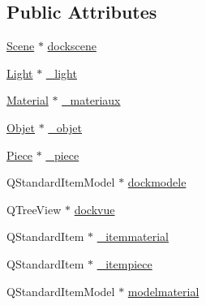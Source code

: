 \subsection*{Public Attributes}
\begin{DoxyCompactItemize}
\item 
\hyperlink{class_scene}{Scene} $\ast$ \hyperlink{class_mondock_ac6fd15f2143e05b554f3f936e6f1588f}{dockscene}
\item 
\hyperlink{class_light}{Light} $\ast$ \hyperlink{class_mondock_a541a241aadaf9820926b427f2d504573}{\+\_\+light}
\item 
\hyperlink{class_material}{Material} $\ast$ \hyperlink{class_mondock_ada15f5ec6dabb8728651472f5cc867a8}{\+\_\+materiaux}
\item 
\hyperlink{class_objet}{Objet} $\ast$ \hyperlink{class_mondock_a6325a3fb92643c99815b1a8025f7d401}{\+\_\+objet}
\item 
\hyperlink{class_piece}{Piece} $\ast$ \hyperlink{class_mondock_a8a9c524e7a781e45219699b15b20596f}{\+\_\+piece}
\item 
Q\+Standard\+Item\+Model $\ast$ \hyperlink{class_mondock_a3f46e1710907a9aedf250fce4ba93076}{dockmodele}
\item 
Q\+Tree\+View $\ast$ \hyperlink{class_mondock_a32e24e3ef7312fbd292740e19c3d3dcd}{dockvue}
\item 
Q\+Standard\+Item $\ast$ \hyperlink{class_mondock_ab873f19cf3a771dcb0f32480e3ea2c69}{\+\_\+itemmaterial}
\item 
Q\+Standard\+Item $\ast$ \hyperlink{class_mondock_a3de76b6bfaee199ee945f04c3c2f4c02}{\+\_\+itempiece}
\item 
Q\+Standard\+Item\+Model $\ast$ \hyperlink{class_mondock_aceda9fef8d2c8b9c88672bacbeac7988}{modelmaterial}
\end{DoxyCompactItemize}
